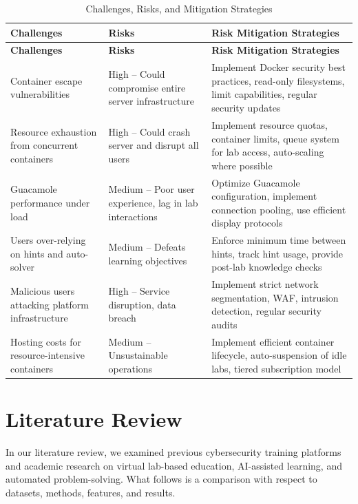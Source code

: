 \documentclass[12pt,a4paper]{report}
\newcommand{\hrow}{}
\newcommand{\hcell}[1]{\textbf{#1}}
\newcommand{\altrow}{}
\begin{document}
\begin{longtable}{|L{3.8cm}|L{4.5cm}|L{5.7cm}|}
\caption{Challenges, Risks, and Mitigation Strategies}\label{tab:risks}\\
\hline
\hrow \hcell{Challenges} & \hcell{Risks} & \hcell{Risk Mitigation Strategies} \\
\hline
\endfirsthead
\hline
\hrow \hcell{Challenges} & \hcell{Risks} & \hcell{Risk Mitigation Strategies} \\
\hline
\endhead
Container escape vulnerabilities & High -- Could compromise entire server infrastructure & Implement Docker security best practices, read-only filesystems, limit capabilities, regular security updates \\\hline
\altrow Resource exhaustion from concurrent containers & High -- Could crash server and disrupt all users & Implement resource quotas, container limits, queue system for lab access, auto-scaling where possible \\\hline
Guacamole performance under load & Medium -- Poor user experience, lag in lab interactions & Optimize Guacamole configuration, implement connection pooling, use efficient display protocols \\\hline
\altrow Users over-relying on hints and auto-solver & Medium -- Defeats learning objectives & Enforce minimum time between hints, track hint usage, provide post-lab knowledge checks \\\hline
Malicious users attacking platform infrastructure & High -- Service disruption, data breach & Implement strict network segmentation, WAF, intrusion detection, regular security audits \\\hline
\altrow Hosting costs for resource-intensive containers & Medium -- Unsustainable operations & Implement efficient container lifecycle, auto-suspension of idle labs, tiered subscription model \\\hline
\end{longtable}

\chapter{Literature Review}

In our literature review, we examined previous cybersecurity training platforms and academic research
on virtual lab-based education, AI-assisted learning, and automated problem-solving. What follows is a
comparison with respect to datasets, methods, features, and results.
\end{document}
